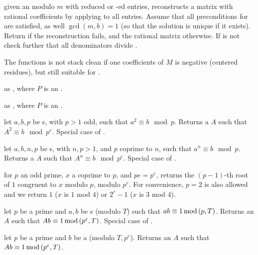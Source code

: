 given an  modulo $m$ with reduced or -ed entries,
reconstructs a matrix with rational coefficients by applying 
to all entries. Assume that all preconditions for  are
satisfied, as well $\gcd(m,b) = 1$ (so that the solution is unique if it
exists). Return  if the reconstruction fails, and the rational
matrix otherwise. If  is not  check further that all
denominators divide .

The functions is not stack clean if one coefficients of $M$ is negative
(centered residues), but still suitable for .

 as
, where $P$ is an .

 as
, where $P$ is an .


 let
$a,b,p$ be s, with $p > 1$ odd, such that $a^2\equiv b\mod p$.
Returns a  $A$ such that $A^2 \equiv b \mod p^e$. Special case
of .

 let
$a,b,n,p$ be s, with $n,p > 1$, and $p$ coprime to $n$,
such that $a^n \equiv b \mod p$. Returns a  $A$ such that
$A^n \equiv b \mod p^e$. Special case of .

 for $p$ an odd prime,
$x$ a  coprime to $p$, and $pe = p^e$, returns the $(p-1)$-th root of
$1$ congruent to $x$ modulo $p$, modulo $p^e$. For convenience, $p = 2$ is
also allowed and we return $1$ ($x$ is $1$ mod $4$) or $2^e - 1$ ($x$ is $3$
mod $4$).

 let
$p$ be a prime  and $a,b$ be s (modulo $T$) such that $a\*b
\equiv 1 \mod (p,T)$.  Returns an  $A$ such that
$A\*b \equiv 1 \mod (p^e, T)$.  Special case of .

 let
$p$ be a prime  and $b$ be a  (modulo $T, p^e$).
Returns an  $A$ such that $A\*b \equiv 1 \mod (p^e, T)$.

